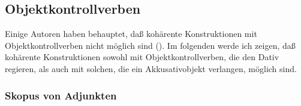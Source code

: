 \subsection{Objektkontrollverben}
\label{sec-obj-control-phen}

Einige Autoren haben behauptet, daß kohärente Konstruktionen mit Objektkontrollverben
nicht möglich sind (\citealp[]{Sternefeld85b}).
Im folgenden werde ich zeigen, daß kohärente Konstruktionen sowohl mit Objektkontrollverben,
die den Dativ regieren, als auch mit solchen, die ein Akkusativobjekt verlangen, möglich
sind.

\subsubsection{Skopus von Adjunkten}
\label{sec-obj-contr-scope}

